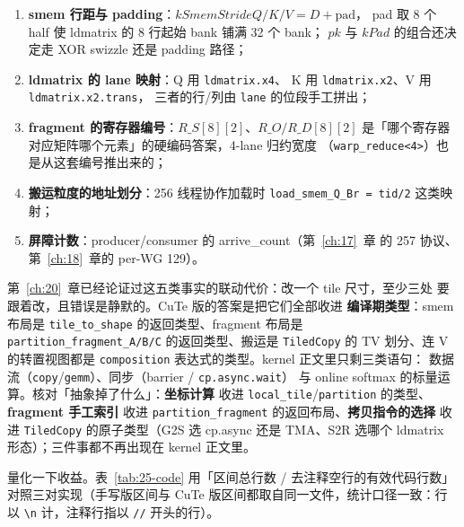 \begin{enumerate}
  \item \textbf{smem 行距与 padding}：$kSmemStrideQ/K/V = D+\mathrm{pad}$，
        pad 取 8 个 half 使 ldmatrix 的 8 行起始 bank 铺满 32 个 bank；
        $pk$ 与 $kPad$ 的组合还决定走 XOR swizzle 还是 padding 路径；
  \item \textbf{ldmatrix 的 lane 映射}：Q 用 \texttt{ldmatrix.x4}、
        K 用 \texttt{ldmatrix.x2}、V 用 \texttt{ldmatrix.\allowbreak{}x2.trans}，
        三者的行/列由 \texttt{lane} 的位段手工拼出；
  \item \textbf{fragment 的寄存器编号}：$R\_S[8][2]$、$R\_O/R\_D[8][2]$
        是「哪个寄存器对应矩阵哪个元素」的硬编码答案，4-lane 归约宽度
        （\texttt{warp\_\allowbreak{}reduce\allowbreak{}<4>}）也是从这套编号推出来的；
  \item \textbf{搬运粒度的地址划分}：256 线程协作加载时
        \texttt{load\_\allowbreak{}smem\_\allowbreak{}Q\_\allowbreak{}Br =\allowbreak{} tid/\allowbreak{}2} 这类映射；
  \item \textbf{屏障计数}：producer/consumer 的 arrive\_count（第~\ref{ch:17}~章
        的 257 协议、第~\ref{ch:18}~章的 per-WG 129）。
\end{enumerate}

第~\ref{ch:20}~章已经论证过这五类事实的联动代价：改一个 tile 尺寸，至少三处
要跟着改，且错误是静默的。CuTe 版的答案是把它们全部收进
\textbf{编译期类型}：smem 布局是 \texttt{tile\_\allowbreak{}to\_\allowbreak{}shape} 的返回类型、fragment
布局是 \texttt{partition\_\allowbreak{}fragment\_\allowbreak{}A/B/C} 的返回类型、搬运是
\texttt{TiledCopy} 的 TV 划分、连 V 的转置视图都是
\texttt{composition} 表达式的类型。kernel 正文里只剩三类语句：
数据流（\texttt{copy}/\texttt{gemm}）、同步（barrier / \texttt{cp.\allowbreak{}async.\allowbreak{}wait}）
与 online softmax 的标量运算。核对「抽象掉了什么」：\textbf{坐标计算}
收进 \texttt{local\_tile}/\texttt{partition} 的类型、\textbf{fragment 手工索引}
收进 \texttt{partition\_\allowbreak{}fragment} 的返回布局、\textbf{拷贝指令的选择}
收进 \texttt{TiledCopy} 的原子类型（G2S 选 cp.async 还是 TMA、S2R 选哪个
ldmatrix 形态）；三件事都不再出现在 kernel 正文里。

量化一下收益。表~\ref{tab:25-code} 用「区间总行数 / 去注释空行的有效代码行数」
对照三对实现（手写版区间与 CuTe 版区间都取自同一文件，统计口径一致：行以
\texttt{\textbackslash n} 计，注释行指以 \texttt{//} 开头的行）。

